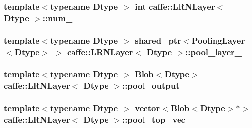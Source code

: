 \hypertarget{classcaffe_1_1_l_r_n_layer_ac68d88464a09f9deaf929908ffbaf345}{
\subsubsection[{num\+\_\+}]{\setlength{\rightskip}{0pt plus 5cm}template$<$typename Dtype $>$ int {\bf caffe\+::\+L\+R\+N\+Layer}$<$ Dtype $>$\+::num\+\_\+\hspace{0.3cm}{\ttfamily [protected]}}}\label{classcaffe_1_1_l_r_n_layer_ac68d88464a09f9deaf929908ffbaf345}
\hypertarget{classcaffe_1_1_l_r_n_layer_a3d883b2d7022bd66e1ac2227400a1caa}{
\subsubsection[{pool\+\_\+layer\+\_\+}]{\setlength{\rightskip}{0pt plus 5cm}template$<$typename Dtype $>$ shared\+\_\+ptr$<${\bf Pooling\+Layer}$<$Dtype$>$ $>$ {\bf caffe\+::\+L\+R\+N\+Layer}$<$ Dtype $>$\+::pool\+\_\+layer\+\_\+\hspace{0.3cm}{\ttfamily [protected]}}}\label{classcaffe_1_1_l_r_n_layer_a3d883b2d7022bd66e1ac2227400a1caa}
\hypertarget{classcaffe_1_1_l_r_n_layer_a7dfcd31ed9694bdd48c9e80bdfe1e7a4}{
\subsubsection[{pool\+\_\+output\+\_\+}]{\setlength{\rightskip}{0pt plus 5cm}template$<$typename Dtype $>$ {\bf Blob}$<$Dtype$>$ {\bf caffe\+::\+L\+R\+N\+Layer}$<$ Dtype $>$\+::pool\+\_\+output\+\_\+\hspace{0.3cm}{\ttfamily [protected]}}}\label{classcaffe_1_1_l_r_n_layer_a7dfcd31ed9694bdd48c9e80bdfe1e7a4}
\hypertarget{classcaffe_1_1_l_r_n_layer_af1d75143e7d103749575c3ee167e1c8d}{
\subsubsection[{pool\+\_\+top\+\_\+vec\+\_\+}]{\setlength{\rightskip}{0pt plus 5cm}template$<$typename Dtype $>$ vector$<${\bf Blob}$<$Dtype$>$$\ast$$>$ {\bf caffe\+::\+L\+R\+N\+Layer}$<$ Dtype $>$\+::pool\+\_\+top\+\_\+vec\+\_\+\hspace{0.3cm}{\ttfamily [protected]}}}\label{classcaffe_1_1_l_r_n_layer_af1d75143e7d103749575c3ee167e1c8d}
